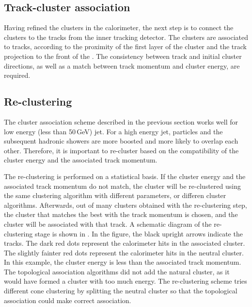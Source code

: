 \subsection{Track-cluster association}

Having refined the clusters in the calorimeter, the next step is to connect the clusters to the tracks from the inner tracking detector. The clusters are associated to tracks, according to the proximity of the first layer of the cluster and the track projection to the front of the \ECAL. The consistency between track and initial cluster directions, as well as a match between track momentum and cluster energy, are required.


\subsection{Re-clustering}

The cluster association scheme described in the previous section works well for low energy (less than 50\,GeV) jet. For a high energy jet, particles and the subsequent hadronic showers are more boosted and more likely to overlap each other. Therefore, it is important to re-cluster based on the compatibility of the cluster energy and the associated track momentum.

The re-clustering is performed on a statistical basis. If the cluster energy and the associated track momentum do not match, the cluster will be re-clustered using the same clustering algorithm with different parameters, or differen cluster algorithms. Afterwards, out of many clusters obtained with the re-clustering step, the cluster that matches the best with the track momentum is chosen, and the cluster will be associated with that track. A schematic diagram of the re-clustering stage is shown in . In the figure, the black upright arrows indicate the tracks. The dark red dots represent the calorimeter hits in the associated cluster. The  slightly fainter red  dots represent the calorimeter hits in the neutral cluster. In this example, the cluster energy is less than the associated track momentum. The topological association algorithms did not add the natural cluster, as it would have formed a cluster with too much energy. The re-clustering scheme tries different cone clustering by splitting the neutral cluster so that the topological association could make correct association.


